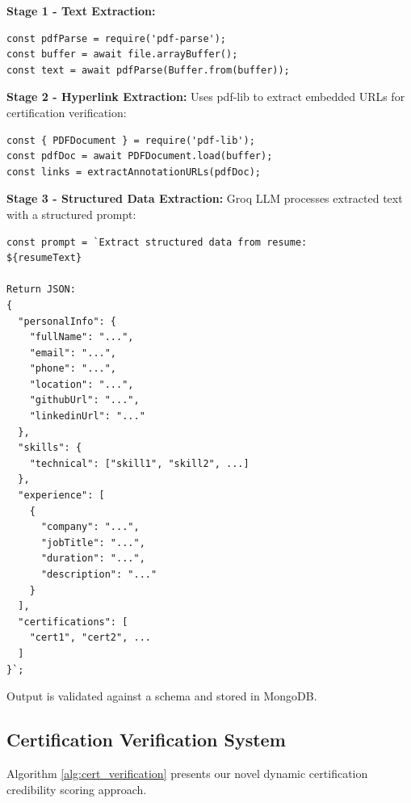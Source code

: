 \documentclass[journal]{IEEEtran}
\begin{document}
\textbf{Stage 1 - Text Extraction:}
\begin{verbatim}
const pdfParse = require('pdf-parse');
const buffer = await file.arrayBuffer();
const text = await pdfParse(Buffer.from(buffer));
\end{verbatim}

\textbf{Stage 2 - Hyperlink Extraction:}
Uses pdf-lib to extract embedded URLs for certification verification:
\begin{verbatim}
const { PDFDocument } = require('pdf-lib');
const pdfDoc = await PDFDocument.load(buffer);
const links = extractAnnotationURLs(pdfDoc);
\end{verbatim}

\textbf{Stage 3 - Structured Data Extraction:}
Groq LLM processes extracted text with a structured prompt:

\begin{verbatim}
const prompt = `Extract structured data from resume:
${resumeText}

Return JSON:
{
  "personalInfo": {
    "fullName": "...",
    "email": "...",
    "phone": "...",
    "location": "...",
    "githubUrl": "...",
    "linkedinUrl": "..."
  },
  "skills": {
    "technical": ["skill1", "skill2", ...]
  },
  "experience": [
    {
      "company": "...",
      "jobTitle": "...",
      "duration": "...",
      "description": "..."
    }
  ],
  "certifications": [
    "cert1", "cert2", ...
  ]
}`;
\end{verbatim}

Output is validated against a schema and stored in MongoDB.

\subsection{Certification Verification System}

\noindent{}

\vspace{0.3cm}

Algorithm \ref{alg:cert_verification} presents our novel dynamic certification credibility scoring approach.
\end{document}
